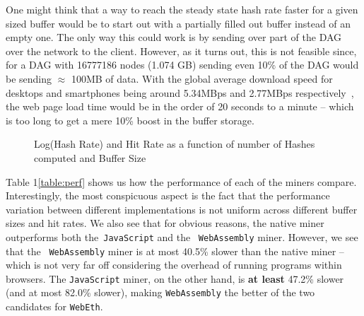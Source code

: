 \documentclass[runningheads]{llncs}
\begin{document}
One might think that a way to reach the steady state hash rate faster for a given sized buffer would be to start out with a partially filled out buffer instead of an empty one. The only way this could work is by sending over part of the DAG over the network to the client. However, as it turns out, this is not feasible since, for a DAG with 16777186 nodes (1.074 GB) sending even 10\% of the DAG would be sending $\approx$ 100MB of data. With the global average download speed for desktops and smartphones being around 5.34MBps and 2.77MBps respectively~\cite{internetSpeed}, the web page load time would be in the order of 20 seconds to a minute -- which is too long to get a mere 10\% boost in the buffer storage. 


\begin{figure}[t]
\captionsetup{justification=centering}
       \centering
\caption{Log(Hash Rate) and Hit Rate as a function of number of Hashes computed and Buffer Size}
\end{figure}

Table 1\ref{table:perf} shows us how the performance of each of the miners compare. Interestingly, the most conspicuous aspect is the fact that the performance variation between different implementations is not uniform across different buffer sizes and hit rates. We also see that for obvious reasons, the native miner outperforms both the~\verb|JavaScript| and the ~\verb|WebAssembly| miner. However, we see that the ~\verb|WebAssembly| miner is at most 40.5\% slower than the native miner -- which is not very far off considering the overhead of running programs within browsers. The \verb|JavaScript| miner, on the other hand, is \textbf{at least} 47.2\% slower (and at most 82.0\% slower), making \verb|WebAssembly| the better of the two candidates for \verb|WebEth|.
\end{document}
